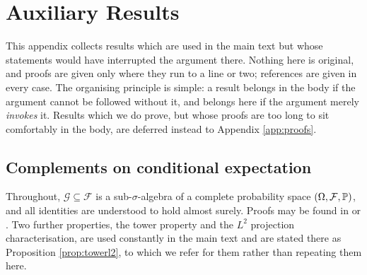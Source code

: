 \chapter{Auxiliary Results}\label{app:auxiliary}

This appendix collects results which are used in the main text but whose statements
would have interrupted the argument there. Nothing here is original, and proofs are given
only where they run to a line or two; references are given in every case. The organising principle is simple: a
result belongs in the body if the argument cannot be followed without it, and belongs
here if the argument merely \emph{invokes} it. Results which we do prove, but whose proofs are too
long to sit comfortably in the body, are deferred instead to Appendix \ref{app:proofs}.

\section{Complements on conditional expectation}\label{app:condexp}

Throughout, $\mathcal{G} \subseteq \mathcal{F}$ is a sub-$\sigma$-algebra of a complete probability
space $(\Omega,\mathcal{F},\mathbb{P})$, and all identities are understood to hold almost surely. Proofs may be found in
\cite{billingsley1995} or \cite{durrett2019}. Two further properties, the tower property and the
$L^2$ projection characterisation, are used constantly in the main text and are
stated there as Proposition \ref{prop:towerl2}, to which we refer for them rather than
repeating them here.

